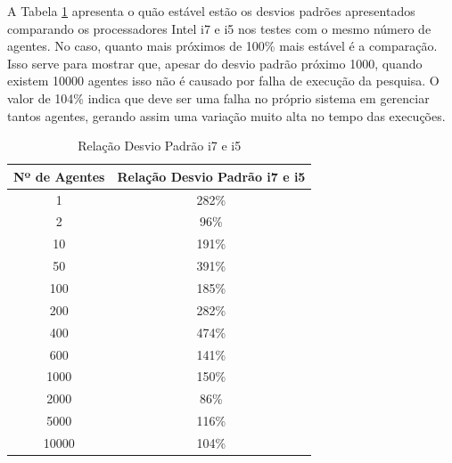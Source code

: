 \documentclass[conference]{IEEEtran}
\begin{document}
        A Tabela \ref{tab:relacao} apresenta o quão estável estão os desvios padrões apresentados comparando os processadores Intel i7 e i5 nos testes com o mesmo número de agentes. No caso, quanto mais próximos de 100\% mais estável é a comparação. Isso serve para mostrar que, apesar do desvio padrão próximo 1000, quando existem 10000 agentes isso não é causado por falha de execução da pesquisa. O valor de 104\% indica que deve ser uma falha no próprio sistema em gerenciar tantos agentes, gerando assim uma variação muito alta no tempo das execuções.
        
        \begin{table}[ht]
            \centering
            \caption{Relação Desvio Padrão i7 e i5}
            \label{tab:relacao}
            \begin{tabular}{|c|c|}
                \hline
                Nº de Agentes & Relação Desvio Padrão i7 e i5 \\ \hline
                1             & 282\%                         \\ \hline
                2             & 96\%                          \\ \hline
                10            & 191\%                         \\ \hline
                50            & 391\%                         \\ \hline
                100           & 185\%                         \\ \hline
                200           & 282\%                         \\ \hline
                400           & 474\%                         \\ \hline
                600           & 141\%                         \\ \hline
                1000          & 150\%                         \\ \hline
                2000          & 86\%                          \\ \hline
                5000          & 116\%                         \\ \hline
                10000         & 104\%                         \\ \hline
            \end{tabular}
        \end{table}
        
\end{document}
